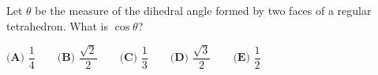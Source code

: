 Let $\theta$ be the measure of the dihedral angle formed by two faces of a regular tetrahedron. What is $\cos\theta$?

$\textbf{(A) }\dfrac14\qquad\textbf{(B) }\dfrac{\sqrt2}{2}\qquad\textbf{(C) }\dfrac13\qquad\textbf{(D) }\dfrac{\sqrt3}{2}\qquad\textbf{(E) }\dfrac12$
